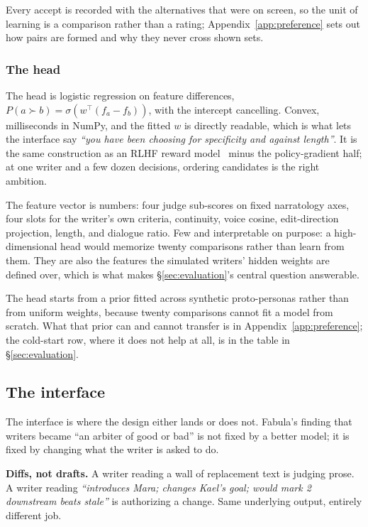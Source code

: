 \documentclass{article}
\begin{document}
Every accept is recorded with the alternatives that were on screen, so the unit of learning
is a comparison rather than a rating; Appendix~\ref{app:preference} sets out how pairs are
formed and why they never cross shown sets.

\subsubsection{The head}

The head is logistic regression on feature differences,
$P(a \succ b) = \sigma\!\left(w^\top(f_a - f_b)\right)$, with the intercept cancelling. Convex, milliseconds in NumPy, and the fitted $w$ is
directly readable, which is what lets the interface say \emph{``you have been choosing for
specificity and against length''}. It is the same construction as an RLHF reward
model~\cite{bradley1952rank,christiano2017preferences,ouyang2022instructgpt} minus the
policy-gradient half; at one writer and a few dozen decisions, ordering candidates is the
right ambition.

The feature vector is \rFeatures{} numbers: four judge sub-scores on fixed narratology
axes, four slots for the writer's own criteria, continuity, voice cosine, edit-direction
projection, length, and dialogue ratio. Few and interpretable on purpose: a high-dimensional head would
memorize twenty comparisons rather than learn from them. They are also the features the simulated
writers' hidden weights are defined over, which is what makes
\S\ref{sec:evaluation}'s central question answerable.


The head starts from a prior fitted across synthetic proto-personas rather than from
uniform weights, because twenty comparisons cannot fit a model from scratch. What that prior can and cannot transfer is in
Appendix~\ref{app:preference}; the cold-start row, where it does not help at all, is in the
table in \S\ref{sec:evaluation}.

\subsection{The interface}

The interface is where the design either lands or does not. Fabula's finding that writers
became ``an arbiter of good or bad'' is not fixed by a better model; it is fixed by changing
what the writer is asked to do.

\textbf{Diffs, not drafts.} A writer reading a wall of replacement text is judging prose. A
writer reading \emph{``introduces Mara; changes Kael's goal; would mark 2 downstream beats
stale''} is authorizing a change. Same underlying output, entirely different job.
\end{document}
